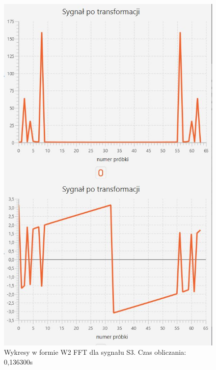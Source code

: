 \documentclass[12pt]{article}
\begin{document}
\begin{figure}[H]
	\centering
	\includegraphics[width=.8\linewidth]{FFT-S3-W2}
	\caption{Wykresy w formie W2 FFT dla sygnału S3. Czas obliczania: 0,136300s}
	\label{S3_sygnal}
\end{figure}
\end{document}
